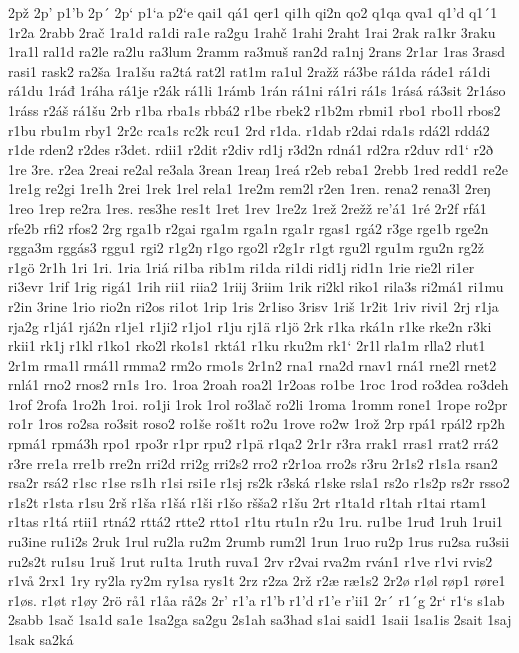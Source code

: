 2pž
2p'
p1'b
2p´
2p`
p1`a
p2`e
qai1
qá1
qer1
qi1h
qi2n
qo2
q1qa
qva1
q1'd
q1´1
1r2a
2rabb
2rač
1ra1d
ra1di
ra1e
ra2gu
1rahč
1rahi
2raht
1rai
2rak
ra1kr
3raku
1ra1l
ral1d
ra2le
ra2lu
ra3lum
2ramm
ra3muš
ran2d
ra1nj
2rans
2r1ar
1ras
3rasd
rasi1
rask2
ra2ša
1ra1šu
ra2tá
rat2l
rat1m
ra1ul
2ražž
rá3be
rá1da
ráde1
rá1di
rá1du
1ráđ
1ráha
rá1je
r2ák
rá1li
1rámb
1rán
rá1ni
rá1ri
rá1s
1rásá
rá3sit
2r1áso
1ráss
r2áš
rá1šu
2rb
r1ba
rba1s
rbbá2
r1be
rbek2
r1b2m
rbmi1
rbo1
rbo1l
rbos2
r1bu
rbu1m
rby1
2r2c
rca1s
rc2k
rcu1
2rd
r1da.
r1dab
r2dai
rda1s
rdá2l
rddá2
r1de
rden2
r2des
r3det.
rdii1
r2dit
r2div
rd1j
r3d2n
rdná1
rd2ra
r2duv
rd1`
r2ð
1re
3re.
r2ea
2reai
re2al
re3ala
3rean
1reaŋ
1reá
r2eb
reba1
2rebb
1red
redd1
re2e
1re1g
re2gi
1re1h
2rei
1rek
1rel
rela1
1re2m
rem2l
r2en
1ren.
rena2
rena3l
2reŋ
1reo
1rep
re2ra
1res.
res3he
res1t
1ret
1rev
1re2z
1rež
2režž
re'á1
1ré
2r2f
rfá1
rfe2b
rfi2
rfos2
2rg
rga1b
r2gai
rga1m
rga1n
rga1r
rgas1
rgá2
r3ge
rge1b
rge2n
rgga3m
rggás3
rggu1
rgi2
r1g2ŋ
r1go
rgo2l
r2g1r
r1gt
rgu2l
rgu1m
rgu2n
rg2ž
r1gö
2r1h
1ri
1ri.
1ria
1riá
ri1ba
rib1m
ri1da
ri1di
rid1j
rid1n
1rie
rie2l
ri1er
ri3evr
1rif
1rig
rigá1
1rih
rii1
riia2
1riij
3riim
1rik
ri2kl
riko1
rila3s
ri2má1
ri1mu
r2in
3rine
1rio
rio2n
ri2os
ri1ot
1rip
1ris
2r1iso
3risv
1riš
1r2it
1riv
rivi1
2rj
r1ja
rja2g
r1já1
rjá2n
r1je1
r1ji2
r1jo1
r1ju
rj1ä
r1jö
2rk
r1ka
rká1n
r1ke
rke2n
r3ki
rkii1
rk1j
r1kl
r1ko1
rko2l
rko1s1
rktá1
r1ku
rku2m
rk1`
2r1l
rla1m
rlla2
rlut1
2r1m
rma1l
rmá1l
rmma2
rm2o
rmo1s
2r1n2
rna1
rna2d
rnav1
rná1
rne2l
rnet2
rnlá1
rno2
rnos2
rn1s
1ro.
1roa
2roah
roa2l
1r2oas
ro1be
1roc
1rod
ro3dea
ro3deh
1rof
2rofa
1ro2h
1roi.
ro1ji
1rok
1rol
ro3lač
ro2li
1roma
1romm
rone1
1rope
ro2pr
ro1r
1ros
ro2sa
ro3sit
roso2
ro1še
roš1t
ro2u
1rove
ro2w
1rož
2rp
rpá1
rpál2
rp2h
rpmá1
rpmá3h
rpo1
rpo3r
r1pr
rpu2
r1pä
r1qa2
2r1r
r3ra
rrak1
rras1
rrat2
rrá2
r3re
rre1a
rre1b
rre2n
rri2d
rri2g
rri2s2
rro2
r2r1oa
rro2s
r3ru
2r1s2
r1s1a
rsan2
rsa2r
rsá2
r1sc
r1se
rs1h
r1si
rsi1e
r1sj
rs2k
r3ská
r1ske
rsla1
rs2o
r1s2p
rs2r
rsso2
r1s2t
r1sta
r1su
2rš
r1ša
r1šá
r1ši
r1šo
ršša2
r1šu
2rt
r1ta1d
r1tah
r1tai
rtam1
r1tas
r1tá
rtii1
rtná2
rttá2
rtte2
rtto1
r1tu
rtu1n
r2u
1ru.
ru1be
1ruđ
1ruh
1rui1
ru3ine
ru1i2s
2ruk
1rul
ru2la
ru2m
2rumb
rum2l
1run
1ruo
ru2p
1rus
ru2sa
ru3sii
ru2s2t
ru1su
1ruš
1rut
ru1ta
1ruth
ruva1
2rv
r2vai
rva2m
rván1
r1ve
r1vi
rvis2
r1vå
2rx1
1ry
ry2la
ry2m
ry1sa
rys1t
2rz
r2za
2rž
r2æ
ræ1s2
2r2ø
r1øl
røp1
røre1
r1øs.
r1øt
r1øy
2rö
rå1
r1åa
rå2s
2r'
r1'a
r1'b
r1'd
r1'e
r'ii1
2r´
r1´g
2r`
r1`s
s1ab
2sabb
1sač
1sa1d
sa1e
1sa2ga
sa2gu
2s1ah
sa3had
s1ai
said1
1saii
1sa1is
2sait
1saj
1sak
sa2ká
